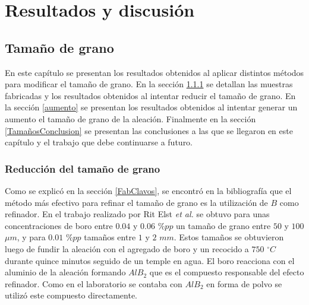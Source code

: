 \documentclass[a4paper,12pt,fleqn,twoside,openany]{book}
\begin{document}
\chapter{Resultados y discusión}
\label{sec:resultados}


\section{Tamaño de grano}

En este capítulo se presentan los resultados obtenidos al aplicar distintos métodos para modificar el tamaño de grano. En la sección \ref{reduccion} se detallan las muestras fabricadas y los resultados obtenidos al intentar reducir el tamaño de grano. En la sección \ref{aumento} se presentan los resultados obtenidos al intentar generar un aumento el tamaño de grano de la aleación. Finalmente en la sección \ref{TamañosConclusion} se presentan las conclusiones a las que se llegaron en este capítulo y el trabajo que debe continuarse a futuro. 


\subsection{Reducción del tamaño de grano} \label{reduccion}

Como se explicó en la sección \ref{FabClavos}, se encontró en la bibliografía que el método más efectivo para refinar el tamaño de grano es la utilización de $B$ como refinador. En el trabajo realizado por Rit Elst \textit{et al.} \cite{ritelst} se obtuvo para unas concentraciones de boro entre $0.04$ y $0.06$ $\% pp$ un tamaño de grano entre $50$ y $100$ $\mu m$, y para $0.01$ $\%pp$ tamaños entre $1$ y $2$ $mm$. Estos tamaños se obtuvieron luego de fundir la aleación con el agregado de boro y un recocido a $750$ $^\circ C$ durante quince minutos seguido de un temple en agua. El boro reacciona con el aluminio de la aleación formando $AlB_2$ que es el compuesto responsable del efecto refinador. Como en el laboratorio se contaba con $AlB_2$ en forma de polvo se utilizó este compuesto directamente. 
\end{document}
